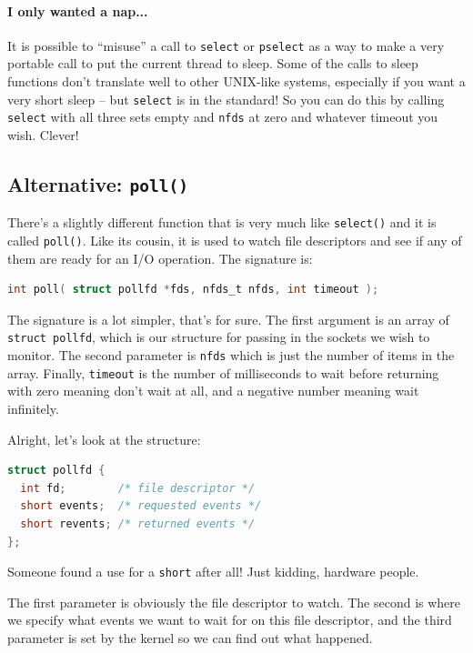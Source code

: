 \paragraph{I only wanted a nap...} It is possible to ``misuse'' a call to \texttt{select} or \texttt{pselect} as a way to make a very portable call to put the current thread to sleep. Some of the calls to sleep functions don't translate well to other UNIX-like systems, especially if you want a very short sleep -- but \texttt{select} is in the standard! So you can do this by calling \texttt{select} with all three sets empty and \texttt{nfds} at zero and whatever timeout you wish. Clever!

\subsection*{Alternative: \texttt{poll()}}
There's a slightly different function that is very much like \texttt{select()} and it is called \texttt{poll()}. Like its cousin, it is used to watch file descriptors and see if any of them are ready for an I/O operation. The signature is:

\begin{lstlisting}[language=C]
int poll( struct pollfd *fds, nfds_t nfds, int timeout );
\end{lstlisting}

The signature is a lot simpler, that's for sure. The first argument is an array of \texttt{struct pollfd}, which is our structure for passing in the sockets we wish to monitor. The second parameter is \texttt{nfds} which is just the number of items in the array. Finally, \texttt{timeout} is the number of milliseconds to wait before returning with zero meaning don't wait at all, and a negative number meaning wait infinitely.

Alright, let's look at the structure:

\begin{lstlisting}[language=C]
struct pollfd {
  int fd;        /* file descriptor */
  short events;  /* requested events */
  short revents; /* returned events */
};
\end{lstlisting}

Someone found a use for a \texttt{short} after all! Just kidding, hardware people.

The first parameter is obviously the file descriptor to watch. The second is where we specify what events we want to wait for on this file descriptor, and the third parameter is set by the kernel so we can find out what happened.

